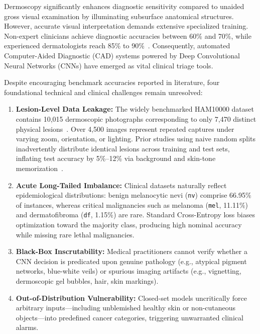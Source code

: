 \documentclass[conference]{IEEEtran}
\begin{document}
Dermoscopy significantly enhances diagnostic sensitivity compared to unaided gross visual examination by illuminating subsurface anatomical structures. However, accurate visual interpretation demands extensive specialized training. Non-expert clinicians achieve diagnostic accuracies between 60\% and 70\%, while experienced dermatologists reach 85\% to 90\%~\cite{argenziano1998}. Consequently, automated Computer-Aided Diagnostic (CAD) systems powered by Deep Convolutional Neural Networks (CNNs) have emerged as vital clinical triage tools.

Despite encouraging benchmark accuracies reported in literature, four foundational technical and clinical challenges remain unresolved:
\begin{enumerate}
    \item \textbf{Lesion-Level Data Leakage:} The widely benchmarked HAM10000 dataset contains 10,015 dermoscopic photographs corresponding to only 7,470 distinct physical lesions~\cite{tschandl2018}. Over 4,500 images represent repeated captures under varying zoom, orientation, or lighting. Prior studies using naive random splits inadvertently distribute identical lesions across training and test sets, inflating test accuracy by 5\%–12\% via background and skin-tone memorization~\cite{cassidy2022}.
    \item \textbf{Acute Long-Tailed Imbalance:} Clinical datasets naturally reflect epidemiological distributions: benign melanocytic nevi (\texttt{nv}) comprise 66.95\% of instances, whereas critical malignancies such as melanoma (\texttt{mel}, 11.11\%) and dermatofibroma (\texttt{df}, 1.15\%) are rare. Standard Cross-Entropy loss biases optimization toward the majority class, producing high nominal accuracy while missing rare lethal malignancies.
    \item \textbf{Black-Box Inscrutability:} Medical practitioners cannot verify whether a CNN decision is predicated upon genuine pathology (e.g., atypical pigment networks, blue-white veils) or spurious imaging artifacts (e.g., vignetting, dermoscopic gel bubbles, hair, skin markings).
    \item \textbf{Out-of-Distribution Vulnerability:} Closed-set models uncritically force arbitrary inputs—including unblemished healthy skin or non-cutaneous objects—into predefined cancer categories, triggering unwarranted clinical alarms.
\end{enumerate}
\end{document}
